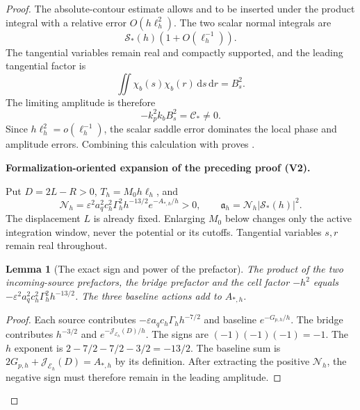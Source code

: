 \documentclass[11pt]{article}
\newtheorem{lemma}[theorem]{Lemma}
\newcommand{\formalisationparentid}{X}
\newenvironment{formalisationaddition}[1]{\par\medskip\begingroup\color{blue}\def\formalisationparentid{#1}\setcounter{formalizationsublemma}{0}\let\lemma\formalizationsublemma\let\endlemma\endformalizationsublemma
  \def\Eo{\mathcal E_h^\circ}\def\EE{\mathcal E_h}\def\phio{\phi_h^\circ}\def\phih{\phi_h}\def\Ho{H_h^{\rm atom}(v^\circ)}\def\Ha{H_h^{\rm atom}}\def\HL{H_h^{L}}\def\Dh{D_h}\def\Log{\operatorname{Log}}\def\ellh{\ell_h}\def\Gp{G_{p,h}}\def\Ast{A_{*,h}}\def\ahat{\widehat{\mathfrak a}_h}\def\ah{\mathfrak a_h}\def\rh{\widehat\rho_h}\def\deltah{\widehat\delta_h}\def\oldref##1{\textup{(##1)}}\def\interface##1{\par\noindent\textit{Analytical interface used here.} ##1\par}\def\finish{\par\noindent\textit{Conclusion of the formalization-oriented expansion.} }\par\noindent\textbf{Formalization-oriented expansion of the preceding proof (V2).}\par\smallskip
}{\par\endgroup\medskip
}
\newcommand{\eps}{\varepsilon}
\newcommand{\dd}{\,\mathrm d}
\newcommand{\cJ}{\mathcal J}
\begin{document}
\begin{proof}
The absolute-contour estimate allows  and
 to be inserted under the product integral
with a relative error $O(h\ell_h^2)$.  The two scalar normal integrals are
\[
    \mathcal S_*(h)(1+O(\ell_h^{-1})).
\] 
The tangential variables remain real and compactly supported, and the
leading tangential factor is
\[
 \iint\chi_b(s)\chi_b(r)\dd s\dd r=B_s^2.
\]
The limiting amplitude is therefore
\[
    -k_p^2k_bB_s^2=\mathscr C_*\neq0.
\] 
Since $h\ell_h^2=o(\ell_h^{-1})$, the scalar saddle error dominates the
local phase and amplitude errors. Combining this calculation with  proves
.

\begin{formalisationaddition}{P6.7}
Put $D=2L-R>0$, $T_h=M_0h\ell_h$, and
\[
 \mathcal N_h=\eps^2a_q^2c_h^2\Gamma_h^2h^{-13/2}e^{-A_{*,h}/h}>0,
 \qquad \mathfrak a_h=\mathcal N_h|\mathcal S_*(h)|^2.
\]
The displacement $L$ is already fixed. Enlarging $M_0$ below changes
only the active integration window, never the potential or its cutoffs.
Tangential variables $s,r$ remain real throughout.

\begin{lemma}[The exact sign and power of the prefactor]\label{sublemma:P6-7-prefactor}
The product of the two incoming-source prefactors, the bridge prefactor
and the cell factor $-h^2$ equals
$-\eps^2a_q^2c_h^2\Gamma_h^2h^{-13/2}$.
The three baseline actions add to $A_{*,h}$.
\end{lemma}
\begin{proof}
Each source contributes $-\eps a_qc_h\Gamma_hh^{-7/2}$ and baseline
$e^{-G_{p,h}/h}$. The bridge contributes $h^{-3/2}$ and
$e^{-\cJ_{\EE}(D)/h}$. The signs are $(-1)(-1)(-1)=-1$.
The $h$ exponent is $2-7/2-7/2-3/2=-13/2$.
The baseline sum is $2G_{p,h}+\cJ_{\EE}(D)=A_{*,h}$ by its definition.
After extracting the positive $\mathcal N_h$, the negative sign must
therefore remain in the leading amplitude.
\end{proof}


\end{formalisationaddition}
\end{proof}
\end{document}
